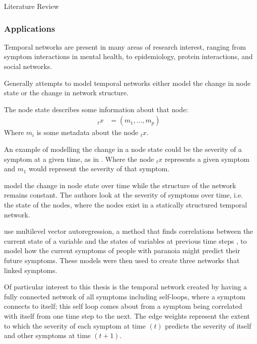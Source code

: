\documentclass[12pt]{amsart}
\begin{document}
\begin{section}{Literature Review}
        \subsubsection{Applications}
        Temporal networks are present in many areas of research interest, ranging from symptom interactions in mental health\cite{jordan2020current,contreras2020temporal}, to epidemiology\cite{masuda2013predicting}, protein interactions\cite{lucas2021inferring,jin2009identifying}, and social networks\cite{moinet2015burstiness,hanneke2010discrete}.     
        
        Generally attempts to model temporal networks either model the change in node state or the change in network structure.
        
        The node state describes some information about that node:
        \begin{align}
            _t x &= (m_1,\ldots, m_p)
        \end{align}
        Where $m_i$ is some metadata about the node $_t x$.

        An example of modelling the change in a node state could be the severity of a symptom at a given time, as in \cite{contreras2020temporal}. Where the node $_t x$ represents a given symptom and $m_1$ would represent the severity of that symptom. 


        \cite{contreras2020temporal} model the change in node state over time while the structure of the network remains constant. The authors look at the severity of symptoms over time, i.e. the state of the nodes, where the nodes exist in a statically structured temporal network. 
        
         use multilevel vector autoregression, a method that finds correlations between the current state of a variable and the states of variables at previous time steps \cite{singer2003applied}, to model how the current symptoms of people with paranoia might predict their future symptoms. These models were then used to create three networks that linked symptoms. 
        
        Of particular interest to this thesis is the temporal network created by having a fully connected network of all symptoms including self-loops, where a symptom connects to itself; this self loop comes about from a symptom being correlated with itself from one time step to the next. The edge weights represent the extent to which the severity of each symptom at time $(t)$ predicts the severity of itself and other symptoms at time $(t+1)$. 
        

\end{section}
\end{document}
